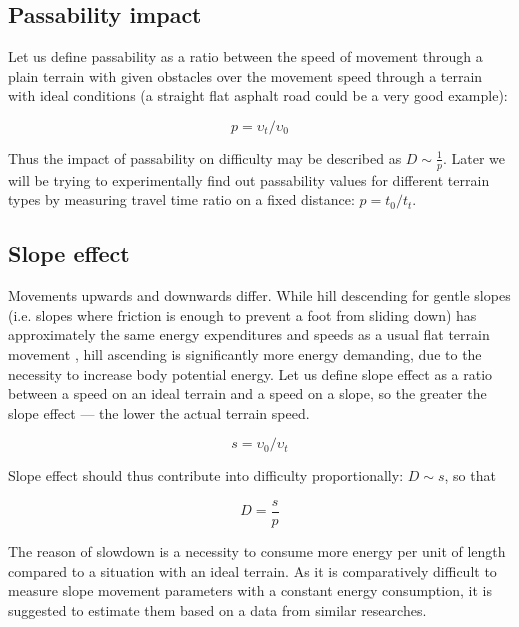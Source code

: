 \documentclass[12pt]{article}
\begin{document}
\subsection{Passability impact}
Let us define passability as a ratio between the speed of movement through a plain terrain with given obstacles over the movement speed through a terrain with ideal conditions (a straight flat asphalt road could be a very good example):

\begin{equation} \label{eq:p-definition}
p = \upsilon_{t}/\upsilon_{0}
\end{equation}

Thus the impact of passability on difficulty may be described as $D\sim\frac{1}{p}$. Later we will be trying to experimentally find out passability values for different terrain types by measuring travel time ratio on a fixed distance: $p=t_{0}/t_{t}$.


\subsection{Slope effect}
Movements upwards and downwards differ. While hill descending for gentle slopes (i.e. slopes where friction is enough to prevent a foot from sliding down) has approximately the same energy expenditures and speeds as a usual flat terrain movement \cite{mets-in-exercise}, hill ascending is significantly more energy demanding, due to the necessity to increase body potential energy. Let us define slope effect as a ratio between a speed on an ideal terrain and a speed on a slope, so the greater the slope effect --- the lower the actual terrain speed.

\begin{equation} \label{eq:s-definition}
s = \upsilon_{0}/\upsilon_{t}
\end{equation}

Slope effect should thus contribute into difficulty proportionally: $D\sim{s}$, so that

\begin{equation} \label{eq:diff-se}
D=\frac{s}{p}
\end{equation}

The reason of slowdown is a necessity to consume more energy per unit of length compared to a situation with an ideal terrain. As it is comparatively difficult to measure slope movement parameters with a constant energy consumption, it is suggested to estimate them based on a data from similar researches.
\end{document}
